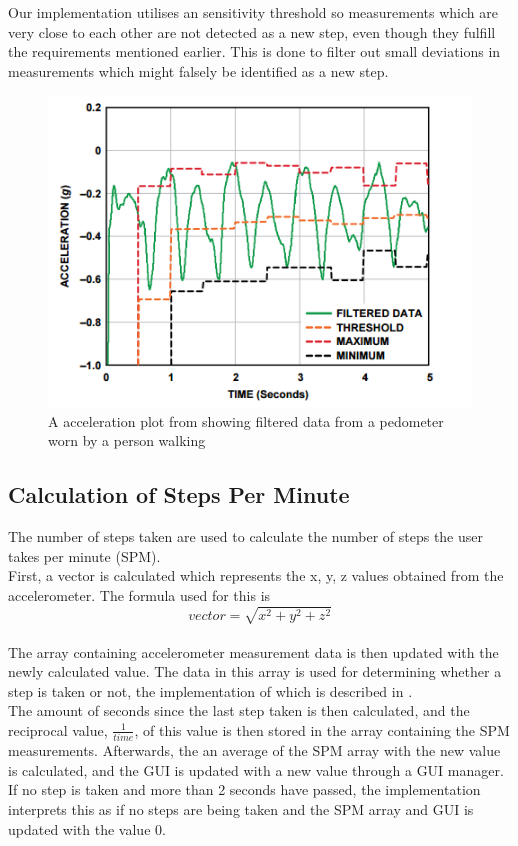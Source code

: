 Our implementation utilises an sensitivity threshold so measurements which are very close to each other are not detected as a new step, even though they fulfill the requirements mentioned earlier. This is done to filter out small deviations in measurements which might falsely be identified as a new step.
\begin{figure}[h!]
  \centering
    \includegraphics[scale=0.8]{Images/accPlot.png}
  \caption{A acceleration plot from \citet[p. 2]{zhao:pedometer} showing filtered data from a pedometer worn by a person walking}
  \label{fig:zhaoGraph}
\end{figure}
\subsection{Calculation of Steps Per Minute}
The number of steps taken are used to calculate the number of steps the user takes per minute (SPM).\\

First, a vector is calculated which represents the x, y, z values obtained from the accelerometer. The formula used for this is $$vector = \sqrt{x^{2} + y^{2} + z^{2}}$$\\

The array containing accelerometer measurement data is then updated with the newly calculated value. The data in this array is used for determining whether a step is taken or not, the implementation of which is described in .\\

The amount of seconds since the last step taken is then calculated, and the reciprocal value, $\frac{1}{time}$, of this value is then stored in the array containing the SPM measurements. Afterwards, the an average of the SPM array with the new value is calculated, and the GUI is updated with a new value through a GUI manager.\\

If no step is taken and more than 2 seconds have passed, the implementation interprets this as if no steps are being taken and the SPM array and GUI is updated with the value 0.